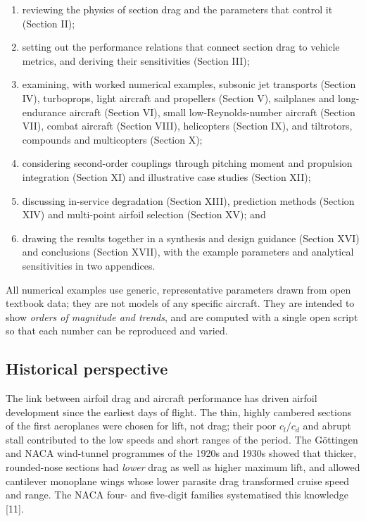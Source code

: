 \documentclass[10pt,a4paper,twocolumn]{article}
\providecommand{\tightlist}{\setlength{\itemsep}{0pt}\setlength{\parskip}{0pt}}
\begin{document}
\begin{enumerate}
\def\labelenumi{\arabic{enumi}.}
\tightlist
\item
  reviewing the physics of section drag and the parameters that control
  it (Section II);
\item
  setting out the performance relations that connect section drag to
  vehicle metrics, and deriving their sensitivities (Section III);
\item
  examining, with worked numerical examples, subsonic jet transports
  (Section IV), turboprops, light aircraft and propellers (Section V),
  sailplanes and long-endurance aircraft (Section VI), small
  low-Reynolds-number aircraft (Section VII), combat aircraft (Section
  VIII), helicopters (Section IX), and tiltrotors, compounds and
  multicopters (Section X);
\item
  considering second-order couplings through pitching moment and
  propulsion integration (Section XI) and illustrative case studies
  (Section XII);
\item
  discussing in-service degradation (Section XIII), prediction methods
  (Section XIV) and multi-point airfoil selection (Section XV); and
\item
  drawing the results together in a synthesis and design guidance
  (Section XVI) and conclusions (Section XVII), with the example
  parameters and analytical sensitivities in two appendices.
\end{enumerate}

All numerical examples use generic, representative parameters drawn from
open textbook data; they are not models of any specific aircraft. They
are intended to show \emph{orders of magnitude and trends}, and are
computed with a single open script so that each number can be reproduced
and varied.

\hypertarget{historical-perspective}{%
\subsection{Historical perspective}\label{historical-perspective}}

The link between airfoil drag and aircraft performance has driven
airfoil development since the earliest days of flight. The thin, highly
cambered sections of the first aeroplanes were chosen for lift, not
drag; their poor \(c_l/c_d\) and abrupt stall contributed to the low
speeds and short ranges of the period. The Göttingen and NACA
wind-tunnel programmes of the 1920s and 1930s showed that thicker,
rounded-nose sections had \emph{lower} drag as well as higher maximum
lift, and allowed cantilever monoplane wings whose lower parasite drag
transformed cruise speed and range. The NACA four- and five-digit
families systematised this knowledge {[}11{]}.
\end{document}
